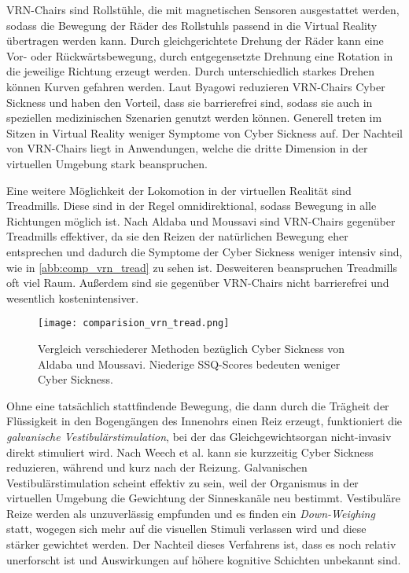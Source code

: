 VRN-Chairs sind Rollst\"uhle, die mit magnetischen Sensoren ausgestattet werden, sodass die Bewegung der R\"ader des Rollstuhls passend in die Virtual Reality \"ubertragen werden kann. Durch gleichgerichtete Drehung der R\"ader kann eine Vor- oder R\"uckw\"artsbewegung, durch entgegensetzte Drehnung eine Rotation in die jeweilige Richtung erzeugt werden. Durch unterschiedlich starkes Drehen k\"onnen Kurven gefahren werden. Laut Byagowi\cite{Byagowi:2014:VRNchair} reduzieren VRN-Chairs Cyber Sickness und haben den Vorteil, dass sie barrierefrei sind, sodass sie auch in speziellen medizinischen Szenarien genutzt werden k\"onnen. Generell treten im Sitzen in Virtual Reality weniger Symptome von Cyber Sickness auf. Der Nachteil von VRN-Chairs liegt in Anwendungen, welche die dritte Dimension in der virtuellen Umgebung stark beanspruchen.

Eine weitere M\"oglichkeit der Lokomotion in der virtuellen Realit\"at sind Treadmills. Diese sind in der Regel omnidirektional, sodass Bewegung in alle Richtungen m\"oglich ist. Nach Aldaba und Moussavi\cite{Aldaba:2019:VRNTread} sind VRN-Chairs gegen\"uber Treadmills effektiver, da sie den Reizen der nat\"urlichen Bewegung eher entsprechen und dadurch die Symptome der Cyber Sickness weniger intensiv sind, wie in \autoref{abb:comp_vrn_tread} zu sehen ist. Desweiteren beanspruchen Treadmills oft viel Raum. Au{\ss}erdem sind sie gegen\"uber VRN-Chairs nicht barrierefrei und wesentlich kostenintensiver.
\begin{figure}[h]
	\centering 
	\texttt{[image: comparision\_vrn\_tread.png]}
	\caption{Vergleich verschiederer Methoden bez\"uglich Cyber Sickness von Aldaba und Moussavi\cite{Aldaba:2019:VRNTread}. Niederige SSQ-Scores bedeuten weniger Cyber Sickness.}
	\label{abb:comp_vrn_tread}
\end{figure}

Ohne eine tats\"achlich stattfindende Bewegung, die dann durch die Tr\"agheit der Fl\"ussigkeit in den Bogeng\"angen des Innenohrs einen Reiz erzeugt, funktioniert die \textit{galvanische Vestibul\"arstimulation}, bei der das Gleichgewichtsorgan nicht-invasiv direkt stimuliert wird. Nach Weech et al.\cite{Weech:2020:GVS} kann sie kurzzeitig Cyber Sickness reduzieren, w\"ahrend und kurz nach der Reizung.
Galvanischen Vestibul\"arstimulation scheint effektiv zu sein, weil der Organismus in der virtuellen Umgebung die Gewichtung der Sinneskan\"ale neu bestimmt. Vestibul\"are Reize werden als unzuverl\"assig empfunden und es finden ein \textit{Down-Weighing} statt, wogegen sich mehr auf die visuellen Stimuli verlassen wird und diese st\"arker gewichtet werden.
Der Nachteil dieses Verfahrens ist, dass es noch relativ unerforscht ist und Auswirkungen auf h\"ohere kognitive Schichten unbekannt sind.



